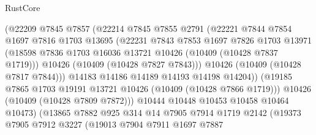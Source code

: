 \begin{lexlean}{RustCore}
\begin{coremodule}
                            (@22209
                              @7845
                              @7857
                              (@22214
                                @7845
                                @7855
                                @2791
                                (@22221
                                  @7844
                                  @7854
                                  @1697
                                  @7816
                                  @1703
                                  @13695
                                  (@22231
                                    @7843
                                    @7853
                                    @1697
                                    @7826
                                    @1703
                                    @13971
                                    (@18598
                                      @7836
                                      @1703
                                      @16036
                                      @13721
                                      @10426
                                      (@10409 (@10428 @7837 @1719)))
                                    @10426
                                    (@10409 (@10428 @7827 @7843)))
                                  @10426
                                  (@10409 (@10428 @7817 @7844)))
                                @14183
                                @14186
                                @14189
                                @14193
                                @14198
                                @14204))
                            (@19185 @7865 @1703 @19191 @13721 @10426 (@10409 (@10428 @7866 @1719)))
                            @10426
                            (@10409 (@10428 @7809 @7872)))
                          @10444
                          @10448
                          @10453
                          @10458
                          @10464
                          @10473)
                        (@13865
                          @7882
                          @925
                          @314
                          @14
                          @7905
                          @7914
                          @1719
                          @2142
                          (@19373
                            @7905
                            @7912
                            @3227
                            (@19013
                              @7904
                              @7911
                              @1697
                              @7887

\end{coremodule}
\end{lexlean}

